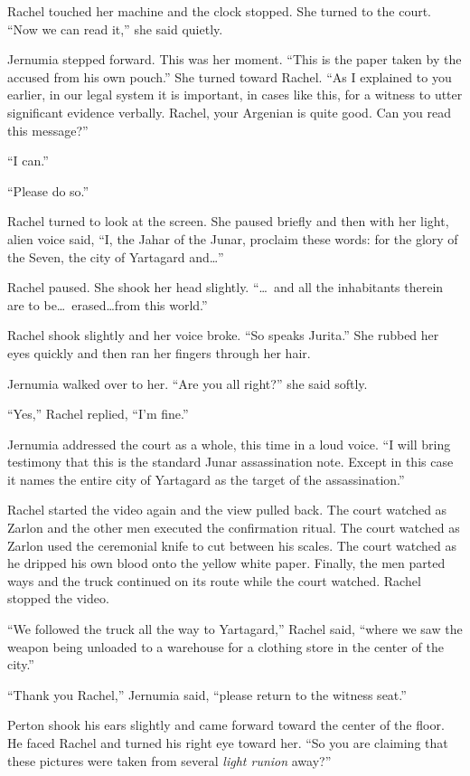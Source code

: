 Rachel touched her machine and the clock stopped. She turned to the court. ``Now we can read
it,'' she said quietly.

Jernumia stepped forward. This was her moment. ``This is the paper taken by the accused from his
own pouch.'' She turned toward Rachel. ``As I explained to you earlier, in our legal system it
is important, in cases like this, for a witness to utter significant evidence verbally. Rachel,
your Argenian is quite good. Can you read this message?''

``I can.''

``Please do so.''

Rachel turned to look at the screen. She paused briefly and then with her light, alien voice
said, ``I, the Jahar of the Junar, proclaim these words: for the glory of the Seven, the city of
Yartagard and\ldots''

Rachel paused. She shook her head slightly. ``\ldots\ and all the inhabitants therein are to
be\ldots\ erased\ldots from this world.''

Rachel shook slightly and her voice broke. ``So speaks Jurita.'' She rubbed her eyes quickly and
then ran her fingers through her hair.

Jernumia walked over to her. ``Are you all right?'' she said softly.

``Yes,'' Rachel replied, ``I'm fine.''

Jernumia addressed the court as a whole, this time in a loud voice. ``I will bring testimony
that this is the standard Junar assassination note. Except in this case it names the entire city
of Yartagard as the target of the assassination.''

Rachel started the video again and the view pulled back. The court watched as Zarlon and the
other men executed the confirmation ritual. The court watched as Zarlon used the ceremonial
knife to cut between his scales. The court watched as he dripped his own blood onto the yellow
white paper. Finally, the men parted ways and the truck continued on its route while the court
watched. Rachel stopped the video.

``We followed the truck all the way to Yartagard,'' Rachel said, ``where we saw the weapon being
unloaded to a warehouse for a clothing store in the center of the city.''

``Thank you Rachel,'' Jernumia said, ``please return to the witness seat.''

Perton shook his ears slightly and came forward toward the center of the floor. He faced Rachel
and turned his right eye toward her. ``So you are claiming that these pictures were taken from
several \emph{light runion} away?''

